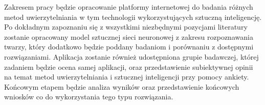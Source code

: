 Zakresem pracy będzie opracowanie platformy internetowej do badania różnych metod uwierzytelniania w tym technologii wykorzystujących sztuczną inteligencję. Po dokładnym zapoznaniu się z wszystkimi niezbędnymi pozycjami literatury zostanie opracowany model sztucznej sieci neuronowej z zakresu rozpoznawania twarzy, który dodatkowo będzie poddany badaniom i porównaniu z dostępnymi rozwiązaniami. Aplikacja zostanie również udostępniona grupie badawczej, której zadaniem będzie ocena samej aplikacji, oraz przedstawienie subiektywnej opinii na temat metod uwierzytelniania i sztucznej inteligencji przy pomocy ankiety. Końcowym etapem będzie analiza wyników oraz przedstawienie końcowych wniosków co do wykorzystania tego typu rozwiązania.







